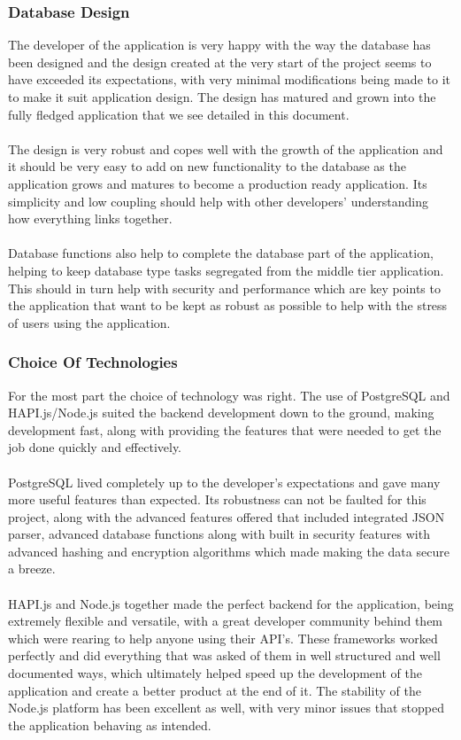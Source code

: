 \subsubsection{Database Design}

The developer of the application is very happy with the way the database has been designed and the design created at the very start of the project seems to have exceeded its expectations, with very minimal modifications being made to it to make it suit application design. The design has matured and grown into the fully fledged application that we see detailed in this document.\\
\\
The design is very robust and copes well with the growth of the application and it should be very easy to add on new functionality to the database as the application grows and matures to become a production ready application. Its simplicity and low coupling should help with other developers' understanding how everything links together.\\
\\
Database functions also help to complete the database part of the application, helping to keep database type tasks segregated from the middle tier application. This should in turn help with security and performance which are key points to the application that want to be kept as robust as possible to help with the stress of users using the application.

\subsubsection{Choice Of Technologies}

For the most part the choice of technology was right. The use of PostgreSQL and HAPI.js/Node.js suited the backend development down to the ground, making development fast, along with providing the features that were needed to get the job done quickly and effectively.\\
\\
PostgreSQL lived completely up to the developer's expectations and gave many more useful features than expected. Its robustness can not be faulted for this project, along with the advanced features offered that included integrated JSON parser, advanced database functions along with built in security features with advanced hashing and encryption algorithms which made making the data secure a breeze.\\
\\
HAPI.js and Node.js together made the perfect backend for the application, being extremely flexible and versatile, with a great developer community behind them which were rearing to help anyone using their API's. These frameworks worked perfectly and did everything that was asked of them in well structured and well documented ways, which ultimately helped speed up the development of the application and create a better product at the end of it. The stability of the Node.js platform has been excellent as well, with very minor issues that stopped the application behaving as intended.

